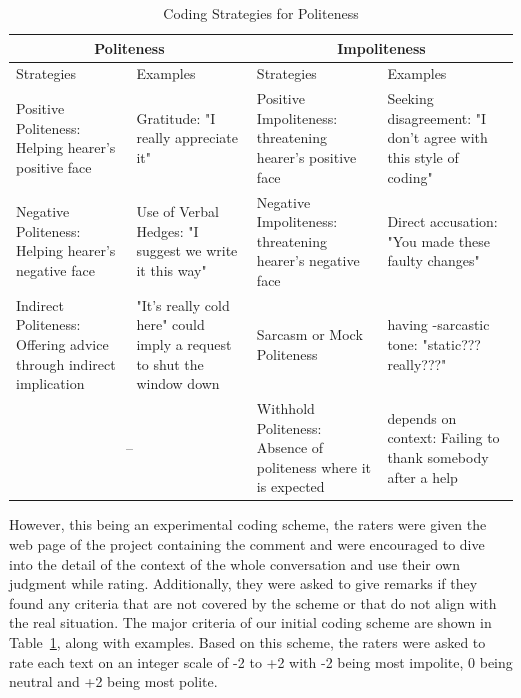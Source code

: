 \FloatBarrier
\begin{table}[H]
	\centering
	\caption{Coding Strategies for Politeness}
	\label{poltable}
	\begin{tabular}{ | m{1.5cm} | m{2cm}|| m{1.5cm} | m{2cm} | }
		\hline
		\multicolumn{2}{|c||}{Politeness} & \multicolumn{2}{c|}{Impoliteness} \\
		\hline
		Strategies & Examples & Strategies & Examples \\ 
		\hline
		Positive Politeness: Helping hearer's positive face  & Gratitude: "I really appreciate it" & Positive Impoliteness: threatening hearer's positive face & Seeking disagreement: "I don't agree with this style of coding" \\
		\hline
		Negative Politeness: Helping hearer's negative face & Use of Verbal Hedges: "I suggest we write it this way" & Negative Impoliteness: threatening hearer's negative face  & Direct accusation: "You made these faulty changes"\\
		\hline
		Indirect Politeness: Offering advice through indirect implication & "It's really cold here" could imply a request to shut the window down & Sarcasm or Mock Politeness & having -sarcastic tone: "static??? really???" \\
		\hline
		\multicolumn{2}{c|}{--} & Withhold Politeness\tablefootnote{Excluded in the modified scheme after the experiment}: Absence of politeness where it is expected & depends on context: Failing to thank somebody after a help\\
		\cline{3-4}
	\end{tabular}
\end{table}

However, this being an experimental coding scheme, the raters were given the web page of the project containing the comment and were encouraged to dive into the detail of the context of the whole conversation and use their own judgment while rating. Additionally, they were asked to give remarks if they found any criteria that are not covered by the scheme or that do not align with the real situation. The major criteria of our initial coding scheme are shown in Table~\ref{poltable}, along with examples. Based on this scheme, the raters were asked to rate each text on an integer scale of -2 to +2 with -2 being most impolite, 0 being neutral and +2 being most polite.  

